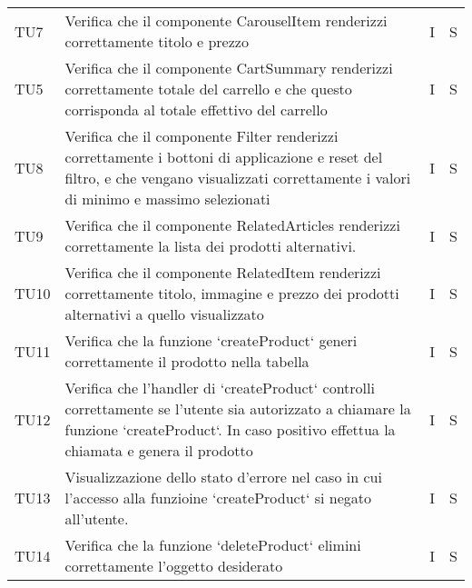 \begin{center}
\begin{longtable}[!h]{p{45px} p{255px} p{35px} p{35px}}
        TU7           & Verifica che il componente CarouselItem renderizzi correttamente titolo e prezzo                                                                                                                 & I              & S              \\
        TU5           & Verifica che il componente CartSummary renderizzi correttamente totale del carrello \newline e che questo corrisponda al totale effettivo del carrello                                           & I              & S              \\
        TU8           & Verifica che il componente Filter renderizzi correttamente i bottoni di applicazione e reset del filtro, e che vengano visualizzati correttamente i valori di minimo e massimo selezionati       & I              & S              \\
        TU9           & Verifica che il componente RelatedArticles renderizzi correttamente la lista dei prodotti alternativi.                                                                                           & I              & S              \\
        TU10          & Verifica che il componente RelatedItem renderizzi correttamente titolo, immagine e prezzo dei prodotti alternativi a quello visualizzato                                                         & I              & S              \\
        TU11          & Verifica che la funzione `createProduct` generi correttamente il prodotto nella tabella                                                                                                          & I              & S              \\
        TU12          & Verifica che l'handler di `createProduct` controlli correttamente se l'utente sia autorizzato a chiamare la funzione `createProduct`. In caso positivo effettua la chiamata e genera il prodotto & I              & S              \\
        TU13          & Visualizzazione dello stato d'errore nel caso in cui l'accesso alla funzioine `createProduct` si negato all'utente.                                                                              & I              & S              \\
        TU14          & Verifica che la funzione `deleteProduct` elimini correttamente l'oggetto desiderato                                                                                                              & I              & S              \\

\end{longtable}
\end{center}
